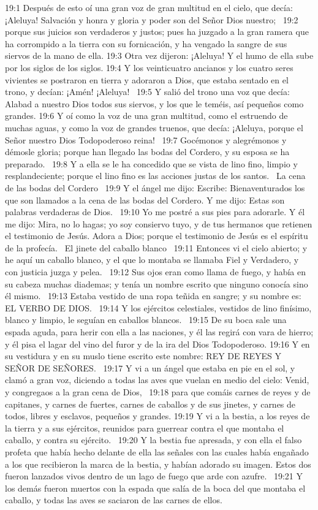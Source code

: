 19:1 Después de esto oí una gran voz de gran multitud en el cielo, que decía: ¡Aleluya! Salvación y honra y gloria y poder son del Señor Dios nuestro;  
19:2 porque sus juicios son verdaderos y justos; pues ha juzgado a la gran ramera que ha corrompido a la tierra con su fornicación, y ha vengado la sangre de sus siervos de la mano de ella. 
19:3 Otra vez dijeron: ¡Aleluya! Y el humo de ella sube por los siglos de los siglos. 
19:4 Y los veinticuatro ancianos y los cuatro seres vivientes se postraron en tierra y adoraron a Dios, que estaba sentado en el trono, y decían: ¡Amén! ¡Aleluya!  
19:5 Y salió del trono una voz que decía: Alabad a nuestro Dios todos sus siervos, y los que le teméis, así pequeños como grandes. 
19:6 Y oí como la voz de una gran multitud, como el estruendo de muchas aguas, y como la voz de grandes truenos, que decía: ¡Aleluya, porque el Señor nuestro Dios Todopoderoso reina!  
19:7 Gocémonos y alegrémonos y démosle gloria; porque han llegado las bodas del Cordero, y su esposa se ha preparado.  
19:8 Y a ella se le ha concedido que se vista de lino fino, limpio y resplandeciente; porque el lino fino es las acciones justas de los santos.  
La cena de las bodas del Cordero  
19:9 Y el ángel me dijo: Escribe: Bienaventurados los que son llamados a la cena de las bodas del Cordero. Y me dijo: Estas son palabras verdaderas de Dios.  
19:10 Yo me postré a sus pies para adorarle. Y él me dijo: Mira, no lo hagas; yo soy consiervo tuyo, y de tus hermanos que retienen el testimonio de Jesús. Adora a Dios; porque el testimonio de Jesús es el espíritu de la profecía.  
El jinete del caballo blanco  
19:11 Entonces vi el cielo abierto; y he aquí un caballo blanco, y el que lo montaba se llamaba Fiel y Verdadero, y con justicia juzga y pelea.  
19:12 Sus ojos eran como llama de fuego, y había en su cabeza muchas diademas; y tenía un nombre escrito que ninguno conocía sino él mismo.  
19:13 Estaba vestido de una ropa teñida en sangre; y su nombre es: EL VERBO DE DIOS.  
19:14 Y los ejércitos celestiales, vestidos de lino finísimo, blanco y limpio, le seguían en caballos blancos.  
19:15 De su boca sale una espada aguda, para herir con ella a las naciones, y él las regirá con vara de hierro; y él pisa el lagar del vino del furor y de la ira del Dios Todopoderoso. 
19:16 Y en su vestidura y en su muslo tiene escrito este nombre: REY DE REYES Y SEÑOR DE SEÑORES.  
19:17 Y vi a un ángel que estaba en pie en el sol, y clamó a gran voz, diciendo a todas las aves que vuelan en medio del cielo: Venid, y congregaos a la gran cena de Dios,  
19:18 para que comáis carnes de reyes y de capitanes, y carnes de fuertes, carnes de caballos y de sus jinetes, y carnes de todos, libres y esclavos, pequeños y grandes. 
19:19 Y vi a la bestia, a los reyes de la tierra y a sus ejércitos, reunidos para guerrear contra el que montaba el caballo, y contra su ejército.  
19:20 Y la bestia fue apresada, y con ella el falso profeta que había hecho delante de ella las señales con las cuales había engañado a los que recibieron la marca de la bestia, y habían adorado su imagen. Estos dos fueron lanzados vivos dentro de un lago de fuego que arde con azufre.  
19:21 Y los demás fueron muertos con la espada que salía de la boca del que montaba el caballo, y todas las aves se saciaron de las carnes de ellos.  
